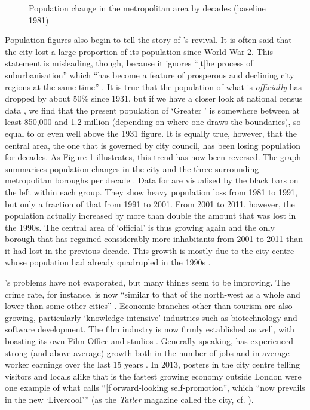 	\begin{figure}[h]
		\centering
		
		\caption[Population change in the  area]{Population change in the  metropolitan area by decades (baseline 1981)}
		\label{fig.population}
	\end{figure}

Population figures also begin to tell the story of 's revival.
It is often said that the city lost a large proportion of its population since World War 2.
This statement is misleading, though, because it ignores ``[t]he process of suburbanisation'' which ``has become a feature of prosperous and declining city regions at the same time'' \citep[21]{fraser2003}.
It is true that the population of what is \emph{officially}  has dropped by about 50\% since 1931, but if we have a closer look at national census data \parencite{nomis}, we find that the present population of `Greater ' is somewhere between at least 850,000 and 1.2 million (depending on where one draws the boundaries), so equal to or even well above the 1931 figure.
It is equally true, however, that the central area, the one that is governed by  city council, has been losing population for decades.
As Figure \ref{fig.population} illustrates, this trend has now been reversed.
The graph summarises population changes in the city and the three surrounding metropolitan boroughs per decade \parencite{nomis}.
Data for  are visualised by the black bars on the left within each group.
They show heavy population loss from 1981 to 1991, but only a fraction of that from 1991 to 2001.
From 2001 to 2011, however, the population actually increased by more than double the amount that was lost in the 1990s.
The central area of `official'  is thus growing again and the only borough that has regained considerably more inhabitants from 2001 to 2011 than it had lost in the previous decade.
This growth is mostly due to the city centre whose population had already quadrupled in the 1990s \citep[cf.][xix]{belchem2006c}.

's problems have not evaporated, but many things seem to be improving.
The crime rate, for instance, is now ``similar to that of the north-west as a whole and lower than some other cities''  \citep[235]{pooley2006}.
Economic branches other than tourism are also growing, particularly `knowledge-intensive' industries such as biotechnology \citep[cf.][204]{percy2003} and software development.
The film industry is now firmly established as well, with  boasting its own Film Office and studios \parencite[cf.][478--480]{murden2006}.
Generally speaking,  has experienced strong (and above average) growth both in the number of jobs and in average worker earnings over the last 15 years \parencite[cf.][4]{lcc2016}.
In 2013, posters in the city centre telling visitors and locals alike that  is the fastest growing economy outside London were one example of what \citet[54]{belchem2006a} calls ``[f]orward-looking self-promotion'', which ``now prevails in the new `Livercool'{}'' (as the \emph{Tatler} magazine called the city, cf. \citealt[484]{murden2006}).

